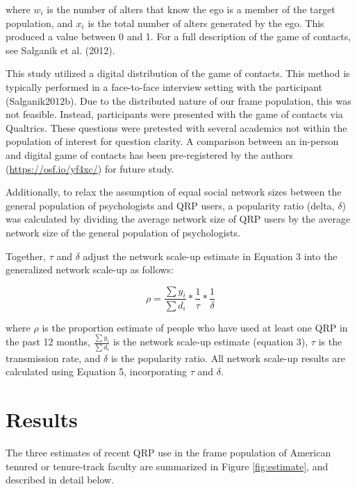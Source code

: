 \documentclass[jou]{apa6}
\theoremstyle{definition}
\theoremstyle{definition}
\theoremstyle{definition}
\theoremstyle{remark}
\begin{document}
where \(w_i\) is the number of alters that know the ego is a member of
the target population, and \(x_i\) is the total number of alters
generated by the ego. This produced a value between 0 and 1. For a full
description of the game of contacts, see Salganik et al. (2012).

This study utilized a digital distribution of the game of contacts. This
method is typically performed in a face-to-face interview setting with
the participant (Salganik2012b). Due to the distributed nature of our
frame population, this was not feasible. Instead, participants were
presented with the game of contacts via Qualtrics. These questions were
pretested with several academics not within the population of interest
for question clarity. A comparison between an in-person and digital game
of contacts has been pre-registered by the authors
(\url{https://osf.io/yf4xc/}) for future study.

Additionally, to relax the assumption of equal social network sizes
between the general population of psychologists and QRP users, a
popularity ratio (delta, \(\delta\)) was calculated by dividing the
average network size of QRP users by the average network size of the
general population of psychologists.

Together, \(\tau\) and \(\delta\) adjust the network scale-up estimate
in Equation 3 into the generalized network scale-up as follows:

\begin{equation}
\rho = \frac{\sum y_i}{\sum d_i} * \frac{1}{\tau} * \frac{1}{\delta}
\end{equation}

where \(\rho\) is the proportion estimate of people who have used at
least one QRP in the past 12 months, \(\frac{\sum y_i}{\sum d_i}\) is
the network scale-up estimate (equation 3), \(\tau\) is the transmission
rate, and \(\delta\) is the popularity ratio. All network scale-up
results are calculated using Equation 5, incorporating \(\tau\) and
\(\delta\).

\section{Results}\label{results}

The three estimates of recent QRP use in the frame population of
American tenured or tenure-track faculty are summarized in Figure
\ref{fig:estimate}, and described in detail below.
\end{document}
